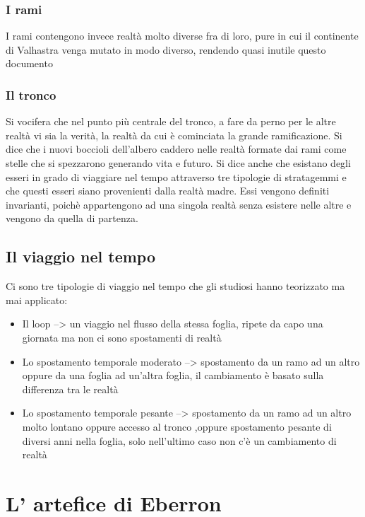 \documentclass[a4paper,12pt]{book}
\begin{document}
\subsubsection{I rami}

I rami contengono invece realtà molto diverse fra di loro, pure in cui il continente di Valhastra venga mutato in modo diverso, rendendo quasi inutile questo documento

\subsubsection{Il tronco}

Si vocifera che nel punto più centrale del tronco, a fare da perno per le altre realtà vi sia la verità, la realtà da cui è cominciata la grande ramificazione.
Si dice che i nuovi boccioli dell'albero caddero nelle realtà formate dai rami come stelle che si spezzarono generando vita e futuro.
Si dice anche che esistano degli esseri in grado di viaggiare nel tempo attraverso tre tipologie di stratagemmi e che questi esseri siano provenienti dalla realtà madre. Essi vengono definiti invarianti, poichè appartengono ad una singola realtà senza esistere nelle altre e vengono da quella di partenza.

\subsection{Il viaggio nel tempo}

Ci sono tre tipologie di viaggio nel tempo che gli studiosi hanno teorizzato ma mai applicato:

\begin{itemize}

\item{Il loop --> un viaggio nel flusso della stessa foglia, ripete da capo una giornata ma non ci sono spostamenti di realtà}
\item{Lo spostamento temporale moderato --> spostamento da un ramo ad un altro oppure da una foglia ad un'altra foglia, il cambiamento è basato sulla differenza tra le realtà}
\item{Lo spostamento temporale pesante --> spostamento da un ramo ad un altro molto lontano oppure accesso al tronco ,oppure spostamento pesante di diversi anni nella foglia, solo nell'ultimo caso non c'è un cambiamento di realtà}

\end{itemize}

\section{L' artefice di Eberron}
\end{document}
